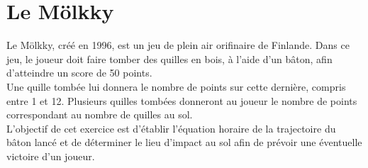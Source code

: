 \documentclass[a4paper,11pt,fleqn]{article}%
\begin{document}
	\maketitle
\section{Le Mölkky}
Le Mölkky, créé en 1996, est un jeu de plein air orifinaire de Finlande.
Dans ce jeu, le joueur doit faire tomber des quilles en bois, à l'aide d'un bâton, afin d'atteindre un score de 50 points.\\
Une quille tombée lui donnera le nombre de points sur cette dernière, compris entre 1 et 12. Plusieurs quilles tombées donneront au joueur le nombre de points correspondant au nombre de quilles au sol.\\

L'objectif de cet exercice est d'établir l'équation horaire de la trajectoire du bâton lancé et de déterminer le lieu d'impact au sol afin de prévoir une éventuelle victoire d'un joueur.
\end{document}
